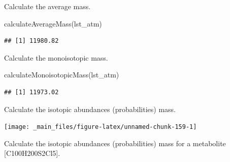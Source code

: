 \documentclass[
]{book}
\newenvironment{Shaded}{\begin{snugshade}}{\end{snugshade}}
\newcommand{\AttributeTok}[1]{\textcolor[rgb]{0.77,0.63,0.00}{#1}}
\newcommand{\DecValTok}[1]{\textcolor[rgb]{0.00,0.00,0.81}{#1}}
\newcommand{\FunctionTok}[1]{\textcolor[rgb]{0.00,0.00,0.00}{#1}}
\newcommand{\NormalTok}[1]{#1}
\newcommand{\OtherTok}[1]{\textcolor[rgb]{0.56,0.35,0.01}{#1}}
\newcommand{\SpecialCharTok}[1]{\textcolor[rgb]{0.00,0.00,0.00}{#1}}
\newcommand{\StringTok}[1]{\textcolor[rgb]{0.31,0.60,0.02}{#1}}
\begin{document}
Calculate the average mass.

\begin{Shaded}
\begin{Highlighting}[]
\FunctionTok{calculateAverageMass}\NormalTok{(lst\_atm)}
\end{Highlighting}
\end{Shaded}

\begin{verbatim}
## [1] 11980.82
\end{verbatim}

Calculate the monoisotopic mass.

\begin{Shaded}
\begin{Highlighting}[]
\FunctionTok{calculateMonoisotopicMass}\NormalTok{(lst\_atm)}
\end{Highlighting}
\end{Shaded}

\begin{verbatim}
## [1] 11973.02
\end{verbatim}

Calculate the isotopic abundances (probabilities) mass.

\begin{Shaded}
\end{Shaded}

\begin{center}\texttt{[image: \_main\_files/figure-latex/unnamed-chunk-159-1]} \end{center}

Calculate the isotopic abundances (probabilities) mass for a metabolite {[}C100H200S2Cl5{]}.
\end{document}
